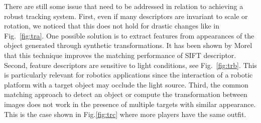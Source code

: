 There are still some issue that need to be addressed in relation to achieving a robust tracking system. First, even if many descriptors are invariant to scale or rotation, we noticed that this does
not hold for drastic changes like in Fig.~\ref{fig:tra}. One possible solution is to extract features from appearances of the object generated through synthetic transformations. It has been shown by Morel \cite{morel2009} that this technique improves the matching performance of SIFT descriptor.  
Second, feature descriptors are sensitive to light conditions, see Fig.~\ref{fig:trb}. This is particularly relevant for robotics applications since the interaction of a robotic platform with a target object may occlude the light source. Third, the common matching approach to detect an object or compute the transformation between images \cite{mikolajczyk05} does not work in the presence of multiple targets with similar appearance. This is the case shown in Fig.\ref{fig:trc} where more players have the same outfit.



